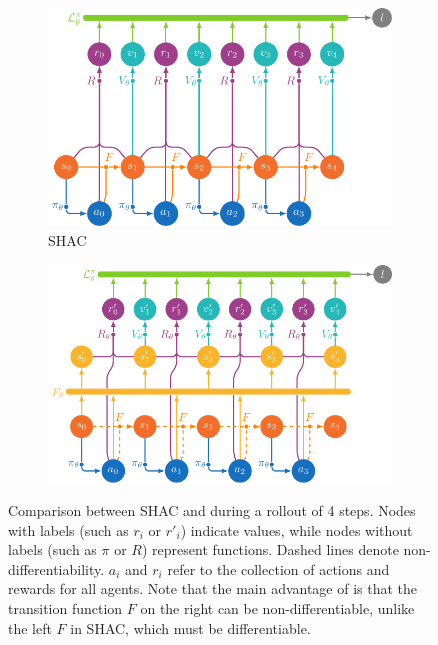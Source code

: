 \begin{figure}[t]
    \centering
    \begin{subfigure}[b]{0.45\textwidth}
        \includegraphics[width=\textwidth]{figs/shac.pdf}
        \caption{SHAC}%
        \label{fig:shac}
    \end{subfigure}
    \begin{subfigure}[b]{0.45\textwidth}
        \includegraphics[width=\textwidth]{figs/shacpp.pdf}
        \caption{\fname{}}%
        \label{fig:shacpp}
    \end{subfigure}
    \caption{
        Comparison between SHAC and \fname{} during a rollout of 4 steps.
        Nodes with labels (such as $r_i$ or $r'_i$) indicate values, while nodes without labels (such as $\pi$ or $R$) represent functions. Dashed lines denote non-differentiability. $a_i$ and $r_i$ refer to the collection of actions and rewards for all agents. Note that the main advantage of \fname{} is that the transition function $F$ on the right can be non-differentiable, unlike the left $F$ in SHAC, which must be differentiable.
        }\label{fig:shac-shacpp}
\end{figure}


